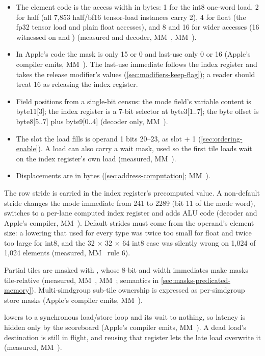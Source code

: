 \begin{itemize}
\item The element code is the access width in bytes: 1 for the int8 one-word load, 2 for half (all 7,853 half/bf16 tensor-load
  instances carry 2), 4 for float (the fp32 tensor load and plain float accesses), and 8 and 16 for wider accesses (16
  witnessed on  and ) (measured and decoder, MM~, MM~).
\item In Apple's code the mask is only 15 or 0 and last-use only 0 or 16 (Apple's compiler emits, MM~). The last-use
  immediate follows the index register and takes the release modifier's values (\cref{sec:modifiers-keep-flag}); a reader should treat 16
  as releasing the index register.
\item Field positions from a single-bit census: the mode field's variable content is byte11{[}3{]}; the index register is a
  7-bit selector at byte3{[}1..7{]}; the byte offset is byte8{[}5..7{]} plus byte9{[}0..4{]} (decoder only, MM~).
\item The slot the load fills is operand 1 bits 20–23, as slot + 1 (\cref{sec:ordering-enable}). A load can also carry a wait mask, used so the
  first tile loads wait on the index register's own load (measured, MM~).
\item Displacements are in bytes (\cref{sec:address-computation}; MM~).
\end{itemize}

The row stride is carried in the index register's precomputed value. A non-default stride changes the mode
immediate from 241 to 2289 (bit 11 of the mode word), switches to a per-lane computed index register and adds ALU code
(decoder and Apple's compiler, MM~). Default strides must come from the operand's
element size: a lowering that used  for every type was twice too small for float and twice too large for int8,
and the 32 × 32 × 64 int8 case was silently wrong on 1,024 of 1,024 elements (measured, MM~ rule 6).

Partial tiles are masked with , whose 8-bit  and width immediates
make masks tile-relative (measured, MM~, MM~; semantics in \cref{sec:masks-predicated-memory}). Multi-simdgroup sub-tile ownership is
expressed as per-simdgroup store masks (Apple's compiler emits, MM~).

 lowers to a synchronous load/store loop and its wait to nothing, so latency is
hidden only by the scoreboard (Apple's compiler emits, MM~). A dead load's destination is still in flight,
and reusing that register lets the late load overwrite it (measured, MM~).

